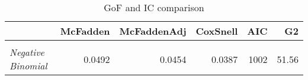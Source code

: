 \begin{table}

\caption{\label{tab:gof_ic_comparison}GoF and IC comparison}
\centering
\begin{tabular}[t]{>{}lrrrrr}
\toprule
  & McFadden & McFaddenAdj & CoxSnell & AIC & G2\\
\midrule
\em{\cellcolor{gray!6}{Poisson}} & \cellcolor{gray!6}{0.0955} & \cellcolor{gray!6}{0.0923} & \cellcolor{gray!6}{0.0863} & \cellcolor{gray!6}{1122} & \cellcolor{gray!6}{118.09}\\
\em{Negative Binomial} & 0.0492 & 0.0454 & 0.0387 & 1002 & 51.56\\
\bottomrule
\end{tabular}
\end{table}
